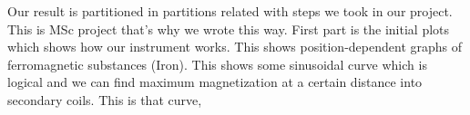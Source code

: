 
Our result is partitioned in partitions related with steps we took in our project. This is MSc project that’s why we wrote this way. First part is the initial plots which shows how  our instrument works. This shows position-dependent graphs of ferromagnetic substances (Iron). This shows some sinusoidal curve which is logical and we can find maximum magnetization at a certain distance into secondary coils. This is that curve,
